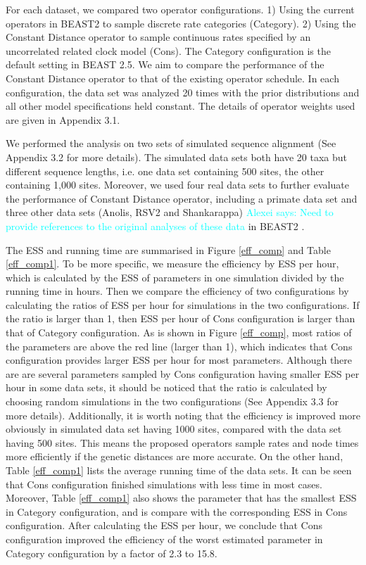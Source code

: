 \documentclass{bmcart}
\newcommand{\alexei}[1]{{\textcolor{cyan} {Alexei says: #1} }}
\begin{document}
For each dataset, we compared two operator configurations. 1) Using the current operators in BEAST2 to sample discrete rate categories (Category). 2) Using the Constant Distance operator to sample continuous rates specified by an uncorrelated related clock model (Cons). The Category configuration is the default setting in BEAST 2.5. We aim to compare the performance of the Constant Distance operator to that of the existing operator schedule. In each configuration, the data set was analyzed 20 times with the prior distributions and all other model specifications held constant. The details of operator weights used are given in Appendix 3.1.

We performed the analysis on two sets of simulated sequence alignment (See Appendix 3.2 for more details). The simulated data sets both have 20 taxa but different sequence lengths, i.e. one data set containing 500 sites, the other containing 1,000 sites. Moreover, we used four real data sets to further evaluate the performance of Constant Distance operator, including a primate data set \cite{finstermeier2013mitogenomic} and three other data sets (Anolis, RSV2 and Shankarappa) \alexei{Need to provide references to the original analyses of these data} in BEAST2 \cite{beast2data}.

The ESS and running time are summarised in Figure \ref{eff_comp} and Table \ref{eff_comp1}. To be more specific, we measure the efficiency by ESS per hour, which is calculated by the ESS of parameters in one simulation divided by the running time in hours. Then we compare the efficiency of two configurations by calculating the ratios of ESS per hour for simulations in the two configurations. If the ratio is larger than 1, then ESS per hour of Cons configuration is larger than that of Category configuration. As is shown in Figure \ref{eff_comp}, most ratios of the parameters are above the red line (larger than 1), which indicates that Cons configuration provides larger ESS per hour for most parameters. Although there are are several parameters sampled by Cons configuration having smaller ESS per hour in some data sets, it should be noticed that the ratio is calculated by choosing random simulations in the two configurations (See Appendix 3.3 for more details). Additionally, it is worth noting that the efficiency is improved more obviously in simulated data set having 1000 sites, compared with the data set having 500 sites. This means the proposed operators sample rates and node times more efficiently if the genetic distances are more accurate. On the other hand, Table \ref{eff_comp1} lists the average running time of the data sets. It can be seen that Cons configuration finished simulations with less time in most cases. Moreover, Table \ref{eff_comp1} also shows the parameter that has the smallest ESS in Category configuration, and is compare with the corresponding ESS in Cons configuration. After calculating the ESS per hour, we conclude that Cons configuration improved the efficiency of the worst estimated parameter in Category configuration by a factor of 2.3 to 15.8. 
\end{document}
